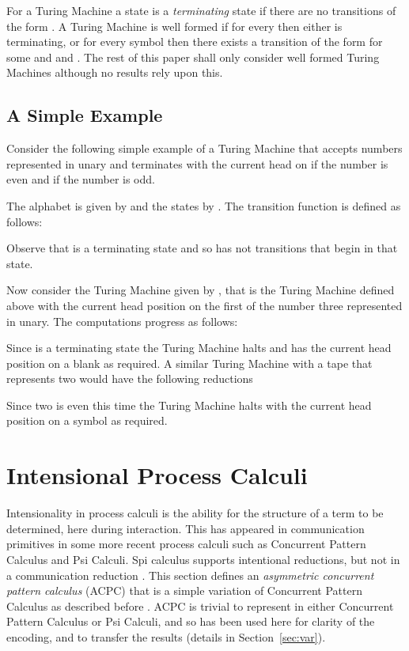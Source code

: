 \documentclass[submission,copyright,creativecommons]{eptcs}
\begin{document}
For a Turing Machine 
a state  is a {\em terminating} state if there are no transitions of the
form .
A Turing Machine is well formed if for every  then either  is terminating, or
for every symbol  then there exists a transition of the
form  for some  and  and .
The rest of this paper shall only consider well formed Turing Machines
although no results rely upon this.


\subsection*{A Simple Example}

Consider the following simple example of a Turing Machine that accepts numbers
represented in unary and terminates with the current head on  if the number is
even and  if the number is odd.

The alphabet is given by  and the states by
.
The transition function  is defined as follows:

Observe that  is a terminating state and so has not transitions that
begin in that state.

Now consider the Turing Machine given by
, that is
the Turing Machine defined above with the current head position on the first  of the
number three represented in unary.
The computations progress as follows:

Since  is a terminating state the Turing Machine halts and has the current head position on a
blank as required.
A similar Turing Machine with a tape that represents two would have the following reductions

Since two is even this time the Turing Machine halts with the current head position on a  symbol
as required.



\section{Intensional Process Calculi}
\label{sec:int}

Intensionality in process calculi is the ability for the structure of a term to be
determined, here during interaction.
This has appeared in communication primitives in some more recent process calculi such
as Concurrent Pattern Calculus and Psi Calculi.
Spi calculus supports intentional reductions, but not in a communication reduction
\cite{Abadi:1997:CCP:266420.266432}.
This section defines an {\em asymmetric concurrent pattern calculus} (ACPC) that
is a simple variation of Concurrent Pattern Calculus as described before \cite{GivenWilsonPhD}.
ACPC is trivial to represent in either Concurrent Pattern Calculus or Psi Calculi,
and so has been used here for clarity of the encoding, and to transfer the results
(details in Section~\ref{sec:var}).
\end{document}
